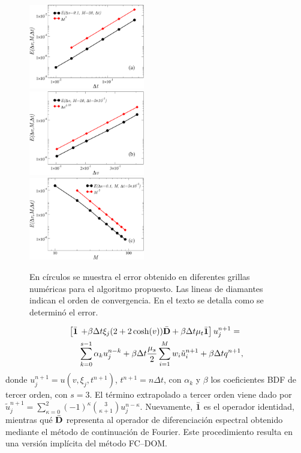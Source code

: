 \begin{figure}
  \includegraphics[width=0.45\textwidth]{figuras/errdt.pdf}\\
  \vspace{2mm}
  \includegraphics[width=0.45\textwidth]{figuras/errdx.pdf}\\
  \vspace{2mm}
  \includegraphics[width=0.45\textwidth]{figuras/xiconv.pdf}
  \caption{En círculos 
  se muestra el error obtenido en diferentes grillas numéricas para el algoritmo 
  propuesto. Las lineas 
  de diamantes indican el orden de convergencia. En el texto se detalla 
  como se determinó el error.}
 \label{fig:conv}
\end{figure}
\begin{equation*}
\begin{aligned}
 \left[ \bar{\mathbf{1}} \right. & \left.+ \beta\Delta t\xi_j (2+2\cosh(v)) \bar{\mathbf{D}} + \beta\Delta t \mu_t \bar{\mathbf{1}} \right]  
 u^{n+1}_j  = \\
&\sum_{k=0}^{s-1}\alpha_k u_j^{n-k} + \beta\Delta t \frac{\mu_s}{2}
 \sum_{i=1}^{M} w_i \tilde{u}_i^{n+1} + \beta\Delta t q^{n+1},
\end{aligned}
\label{eq:transptd1disc}
\end{equation*}
donde $u^{n+1}_j=u(v,\xi_j,t^{n+1})$, $t^{n+1}=n\Delta t$, con $\alpha_k$ y $\beta$ 
los coeficientes BDF de tercer orden, con $s=3$. El término extrapolado 
a tercer orden viene dado por $\tilde{u}_j^{n+1}=\sum_{\kappa=0}^{2}(-1)^\kappa {3 \choose \kappa+1} u_j^{n-\kappa}$. Nuevamente, 
$\bar{\mathbf{1}}$ es el operador identidad, mientras qué $\bar{\mathbf{D}}$ representa al operador 
de diferenciación espectral obtenido mediante el método de continuación de Fourier. Este procedimiento resulta en una versión implícita 
del método FC--DOM. 


